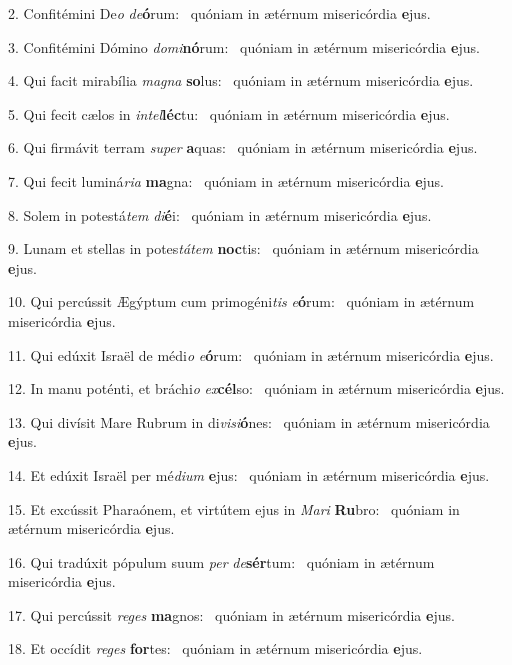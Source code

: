 2. Confitémini De\textit{o} \textit{de}\textbf{ó}rum: \ast\  quóniam in ætérnum misericórdia \textbf{e}jus.\

3. Confitémini Dómino \textit{do}\textit{mi}\textbf{nó}rum: \ast\  quóniam in ætérnum misericórdia \textbf{e}jus.\

4. Qui facit mirabília \textit{ma}\textit{gna} \textbf{so}lus: \ast\  quóniam in ætérnum misericórdia \textbf{e}jus.\

5. Qui fecit cælos in \textit{in}\textit{tel}\textbf{léc}tu: \ast\  quóniam in ætérnum misericórdia \textbf{e}jus.\

6. Qui firmávit terram \textit{su}\textit{per} \textbf{a}quas: \ast\  quóniam in ætérnum misericórdia \textbf{e}jus.\

7. Qui fecit luminá\textit{ri}\textit{a} \textbf{ma}gna: \ast\  quóniam in ætérnum misericórdia \textbf{e}jus.\

8. Solem in potestá\textit{tem} \textit{di}\textbf{é}i: \ast\  quóniam in ætérnum misericórdia \textbf{e}jus.\

9. Lunam et stellas in potes\textit{tá}\textit{tem} \textbf{noc}tis: \ast\  quóniam in ætérnum misericórdia \textbf{e}jus.\

10. Qui percússit Ægýptum cum primogéni\textit{tis} \textit{e}\textbf{ó}rum: \ast\  quóniam in ætérnum misericórdia \textbf{e}jus.\

11. Qui edúxit Israël de médi\textit{o} \textit{e}\textbf{ó}rum: \ast\  quóniam in ætérnum misericórdia \textbf{e}jus.\

12. In manu poténti, et bráchi\textit{o} \textit{ex}\textbf{cél}so: \ast\  quóniam in ætérnum misericórdia \textbf{e}jus.\

13. Qui divísit Mare Rubrum in di\textit{vi}\textit{si}\textbf{ó}nes: \ast\  quóniam in ætérnum misericórdia \textbf{e}jus.\

14. Et edúxit Israël per mé\textit{di}\textit{um} \textbf{e}jus: \ast\  quóniam in ætérnum misericórdia \textbf{e}jus.\

15. Et excússit Pharaónem, et virtútem ejus in \textit{Ma}\textit{ri} \textbf{Ru}bro: \ast\  quóniam in ætérnum misericórdia \textbf{e}jus.\

16. Qui tradúxit pópulum suum \textit{per} \textit{de}\textbf{sér}tum: \ast\  quóniam in ætérnum misericórdia \textbf{e}jus.\

17. Qui percússit \textit{re}\textit{ges} \textbf{ma}gnos: \ast\  quóniam in ætérnum misericórdia \textbf{e}jus.\

18. Et occídit \textit{re}\textit{ges} \textbf{for}tes: \ast\  quóniam in ætérnum misericórdia \textbf{e}jus.\

